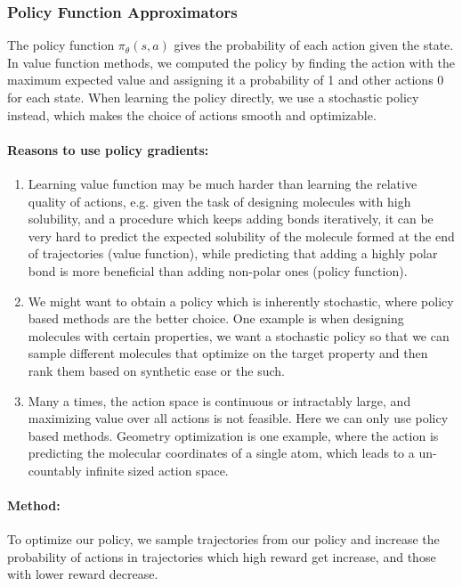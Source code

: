 \subsubsection{Policy Function Approximators}

The policy function $\pi_\theta(s, a)$ gives the probability of each action given the state. In value function methods, we computed the policy by finding the action with the maximum expected value and assigning it a probability of 1 and other actions 0 for each state. When learning the policy directly, we use a stochastic policy instead, which makes the choice of actions smooth and optimizable.

\paragraph{Reasons to use policy gradients:}
\begin{enumerate}
    \item Learning value function may be much harder than learning the relative quality of actions, e.g. given the task of designing molecules with high solubility, and a procedure which keeps adding bonds iteratively, it can be very hard to predict the expected solubility of the molecule formed at the end of trajectories (value function), while predicting that adding a highly polar bond is more beneficial than adding non-polar ones (policy function).
    \item We might want to obtain a policy which is inherently stochastic, where policy based methods are the better choice. One example is when designing molecules with certain properties, we want a stochastic policy so that we can sample different molecules that optimize on the target property and then rank them based on synthetic ease or the such.
    \item Many a times, the action space is continuous or intractably large, and maximizing value over all actions is not feasible. Here we can only use policy based methods. Geometry optimization is one example, where the action is predicting the molecular coordinates of a single atom, which leads to a un-countably infinite sized action space.
\end{enumerate}

\paragraph{Method:}
To optimize our policy, we sample trajectories from our policy and increase the probability of actions in trajectories which high reward get increase, and those with lower reward decrease.


